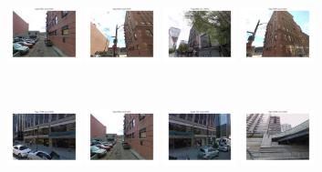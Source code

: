         \begin{minipage}{0.75\linewidth}
            \begin{minipage}{\linewidth} 
                \colorbox{myGreen}{\includegraphics[trim = 35mm 30mm 35mm 30mm, clip=true, height=16mm]{imgs/Pval/exMix09/mixPval01.jpg}}
                \colorbox{myGreen}{\includegraphics[trim = 35mm 30mm 35mm 30mm, clip=true, height=16mm]{imgs/Pval/exMix09/mixPval02.jpg}}
                \colorbox{myRed}{\includegraphics[trim = 35mm 30mm 35mm 30mm, clip=true, height=16mm]{imgs/Pval/exMix09/mixPval03.jpg}}
                \colorbox{myGreen}{\includegraphics[trim = 35mm 30mm 35mm 30mm, clip=true, height=16mm]{imgs/Pval/exMix09/mixPval04.jpg}}
            \end{minipage}
            \\
            \begin{minipage}{\linewidth}
                \colorbox{myRed}{\includegraphics[trim = 35mm 30mm 35mm 30mm, clip=true, height=16mm]{imgs/Pval/exMix09/mix01.jpg}}
                \colorbox{myGreen}{\includegraphics[trim = 35mm 30mm 35mm 30mm, clip=true, height=16mm]{imgs/Pval/exMix09/mix02.jpg}}
                \colorbox{myRed}{\includegraphics[trim = 35mm 30mm 35mm 30mm, clip=true, height=16mm]{imgs/Pval/exMix09/mix03.jpg}}
                \colorbox{myRed}{\includegraphics[trim = 35mm 30mm 35mm 30mm, clip=true, height=16mm]{imgs/Pval/exMix09/mix04.jpg}}
            \end{minipage} 
        \end{minipage}
